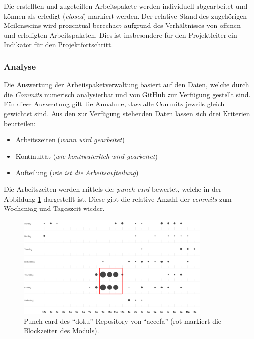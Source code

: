Die erstellten und zugeteilten Arbeitspakete werden individuell
abgearbeitet und können als erledigt (\emph{closed}) markiert werden.
Der relative Stand des zugehörigen Meilensteins wird prozentual
berechnet aufgrund des Verhältnisses von offenen und erledigten
Arbeitspaketen. Dies ist insbesondere für den Projektleiter ein
Indikator für den Projektfortschritt.

\subsubsection{Analyse}
\label{sec:issue-analysis}
Die Auswertung der Arbeitspaketverwaltung basiert auf den Daten, welche
durch die \emph{Commits} numerisch analysierbar und von GitHub zur
Verfügung gestellt sind. Für diese Auswertung gilt die Annahme, dass
alle Commits jeweils gleich gewichtet sind. Aus den zur Verfügung
stehenden Daten lassen sich drei Kriterien beurteilen:

\begin{itemize}
	\item Arbeitszeiten \hfill{} (\textit{wann wird gearbeitet})
	\item Kontinuität \hfill{} (\textit{wie kontinuierlich wird gearbeitet})
	\item Aufteilung \hfill{} (\textit{wie ist die Arbeitsaufteilung})
\end{itemize}

Die Arbeitszeiten werden mittels der \emph{punch card} bewertet, welche
in der Abbildung \ref{fig:gh-punchcard} dargestellt ist. Diese gibt die
relative Anzahl der \emph{commits} zum Wochentag und Tageszeit wieder.

\begin{figure}[h!]
	\centering
	\includegraphics[width=0.85\textwidth]{../../fig/pm/gh-punchcard_marked.pdf}
	\caption{Punch card des ``doku'' Repository von ``accefa''
		(rot markiert die Blockzeiten des Moduls).}
	\label{fig:gh-punchcard}
\end{figure}

